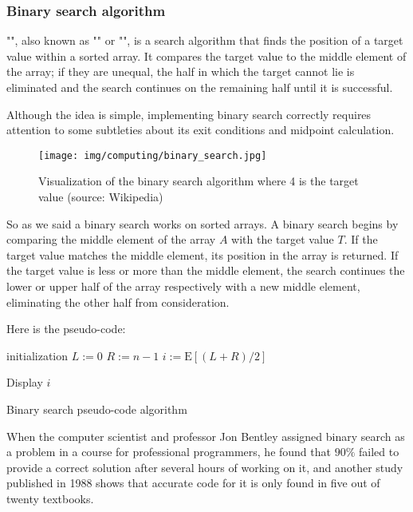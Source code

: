 	\pagebreak
	\subsubsection{Binary search algorithm}
	"", also known as "" or "", is a search algorithm that finds the position of a target value within a sorted array. It compares the target value to the middle element of the array; if they are unequal, the half in which the target cannot lie is eliminated and the search continues on the remaining half until it is successful.

	Although the idea is simple, implementing binary search correctly requires attention to some subtleties about its exit conditions and midpoint calculation.
	\begin{figure}[H]
		\centering
		\texttt{[image: img/computing/binary\_search.jpg]}
		\caption[]{Visualization of the binary search algorithm where 4 is the target value (source: Wikipedia)}
	\end{figure}
	
	So as we said a binary search works on sorted arrays. A binary search begins by comparing the middle element of the array $A$ with the target value $T$. If the target value matches the middle element, its position in the array is returned. If the target value is less or more than the middle element, the search continues the lower or upper half of the array respectively with a new middle element, eliminating the other half from consideration.

	Here is the pseudo-code:
	
	\begin{algorithm}[H]
		initialization\;
		$L:=0$\;
		$R:=n-1$\;
		$i:=\text{E}[(L+R)/2]$\;
			
		Display $i$\;
		\caption{Binary search pseudo-code algorithm}
	\end{algorithm}
	When the computer scientist and professor Jon Bentley assigned binary search as a problem in a course for professional programmers, he found that $90\%$ failed to provide a correct solution after several hours of working on it, and another study published in 1988 shows that accurate code for it is only found in five out of twenty textbooks.

